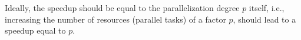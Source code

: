 Ideally, the speedup should be equal to the parallelization degree $p$ itself, i.e., 
increasing the number of resources (parallel tasks) of a factor $p$, should lead to a speedup equal to $p$.

